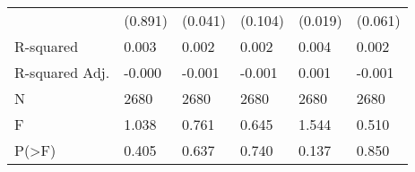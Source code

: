 \begin{tabular}{llllll}
                                  &    (0.891) &   (0.041) &   (0.104) &       (0.019) &   (0.061) \\
R-squared                         &      0.003 &     0.002 &     0.002 &         0.004 &     0.002 \\
R-squared Adj.                    &     -0.000 &    -0.001 &    -0.001 &         0.001 &    -0.001 \\
N                                 &       2680 &      2680 &      2680 &          2680 &      2680 \\
F                                 &      1.038 &     0.761 &     0.645 &         1.544 &     0.510 \\
P(>F)                             &      0.405 &     0.637 &     0.740 &         0.137 &     0.850 \\
\bottomrule
\end{tabular}
